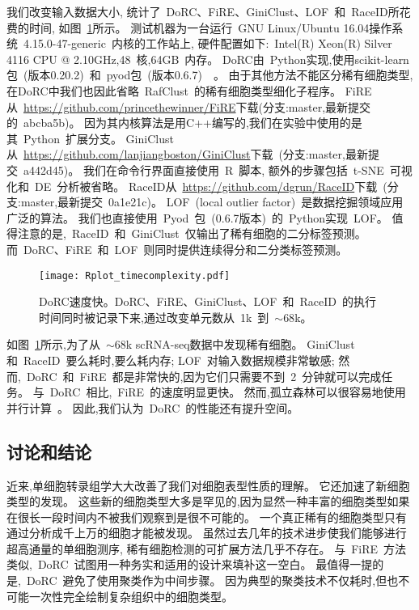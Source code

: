我们改变输入数据大小,
统计了~DoRC、FiRE、GiniClust、LOF~\cite{breunig2000lof}和~RaceID所花费的时间,
如图~\ref{fig:timecomplexity}所示。
测试机器为一台运行~GNU Linux/Ubuntu 16.04操作系统~4.15.0-47-generic~内核的工作站上,
硬件配置如下:~Intel(R) Xeon(R) Silver 4116 CPU @ 2.10GHz,48~核,64GB~内存。
DoRC由~Python实现,使用scikit-learn包~(版本0.20.2)~\cite{pedregosa2011scikit}和~pyod包~(版本0.6.7)~~\cite{zhao2019pyod}。
由于其他方法不能区分稀有细胞类型,在DoRC中我们也因此省略~RafClust~的稀有细胞类型细化子程序。
FiRE从~\url{https://github.com/princethewinner/FiRE}下载(分支:master,最新提交的~abcba5b)。
因为其内核算法是用C++编写的,我们在实验中使用的是其~Python~扩展分支。
GiniClust从~\url{https://github.com/lanjiangboston/GiniClust}下载~(分支:master,最新提交~a442d45)。
我们在命令行界面直接使用~R~脚本,
额外的步骤包括~t-SNE~可视化和~DE~分析被省略。
RaceID从~\url{https://github.com/dgrun/RaceID}下载~(分支:master,最新提交~0a1e21c)。
LOF~(local outlier factor)~是数据挖掘领域应用广泛的算法。
我们也直接使用~Pyod~包~(0.6.7版本)~\cite{zhao2019pyod}的~Python实现~LOF。
值得注意的是,~RaceID~和~GiniClust~仅输出了稀有细胞的二分标签预测。
而~DoRC、FiRE~和~LOF~则同时提供连续得分和二分类标签预测。
\begin{figure}[!htbp]
    \centering
    \texttt{[image: Rplot\_timecomplexity.pdf]}
    \caption{
    DoRC速度快。DoRC、FiRE、GiniClust、LOF~和~RaceID~的执行时间同时被记录下来,通过改变单元数从~1k~到~${\sim} 68$k。    
    }
    \label{fig:timecomplexity}
\end{figure}

如图~\ref{fig:timecomplexity}所示,为了从~${\sim}68$k scRNA-seq数据中发现稀有细胞。 
GiniClust和~RaceID~要么耗时,要么耗内存;
LOF~对输入数据规模非常敏感;
然而,~DoRC~和~FiRE~都是非常快的,因为它们只需要不到~2~分钟就可以完成任务。
与~DoRC~相比,~FiRE~的速度明显更快。
然而,孤立森林可以很容易地使用并行计算~\cite{hariri2018batch}。
因此,我们认为~DoRC~的性能还有提升空间。

\subsection{讨论和结论}
近来,单细胞转录组学大大改善了我们对细胞表型性质的理解。
它还加速了新细胞类型的发现。
这些新的细胞类型大多是罕见的,因为显然一种丰富的细胞类型如果在很长一段时间内不被我们观察到是很不可能的。
一个真正稀有的细胞类型只有通过分析成千上万的细胞才能被发现。
虽然过去几年的技术进步使我们能够进行超高通量的单细胞测序,
稀有细胞检测的可扩展方法几乎不存在。
与~FiRE~方法类似,~DoRC~试图用一种务实和适用的设计来填补这一空白。
最值得一提的是,~DoRC~避免了使用聚类作为中间步骤。
因为典型的聚类技术不仅耗时,但也不可能一次性完全绘制复杂组织中的细胞类型。

